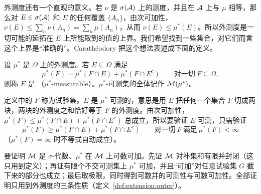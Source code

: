 外测度还有一个直观的意义。若 $\nu$ 是 $\sigma(\mathcal{A})$ 上的测度，并且在 $\mathcal{A}$ 上与 $\mu$ 相等，那么对 $E\in\sigma(\mathcal{A})$ 和 $E$ 的任何覆盖 $\{A_n\}$，由次可加性，$\nu(E)\leqslant\sum_n\nu(A_n)=\sum_n\mu(A_n)$，从而 $\nu(E)\leqslant\mu^*(E)$。所以外测度是一切可能的延拓在 $E$ 上所能取到的值的上界。我们希望找到一些集合，对它们而言这个上界是“准确的”。Carathéodory 把这个想法表述成下面的定义。

\begin{definition}[Carathéodory 可测]\label{def:extension:caratheodory}
设 $\mu^*$ 是 $\Omega$ 上的外测度。若 $E\subseteq\Omega$ 满足
\[
\mu^*(F)=\mu^*(F\cap E)+\mu^*(F\cap E^c)\qquad\text{对一切}\ F\subseteq\Omega,
\]
则称 $E$ 是 （$\mu^*$-measurable）。$\mu^*$-可测集的全体记作 $\mathcal{M}(\mu^*)$。
\end{definition}

定义中的 $F$ 称为试验集。$E$ 是 $\mu^*$-可测的，意思是用 $E$ 把任何一个集合 $F$ 切成两块，两块的外测度之和恰好等于 $F$ 的外测度。由次可加性，$\mu^*(F)\leqslant\mu^*(F\cap E)+\mu^*(F\cap E^c)$ 总成立，所以要验证 $E$ 可测，只需验证
\begin{equation}\label{eq:extension:caratheodory-half}
\mu^*(F)\geqslant\mu^*(F\cap E)+\mu^*(F\cap E^c)\qquad\text{对一切}\ F\ \text{满足}\ \mu^*(F)<\infty
\end{equation}
（$\mu^*(F)=\infty$ 时不等式自动成立）。

\begin{remark}[证明思路]
要证明 $\mathcal{M}$ 是 $\sigma$-代数、$\mu^*$ 在 $\mathcal{M}$ 上可数可加。先证 $\mathcal{M}$ 对补集和有限并封闭（这只用到定义）；再证有限个不交可测集上 $\mu^*$ 可加，并且“可加”对任意试验集 $G$ 截下来的部分也成立；最后取极限，同时得到可数并的可测性与可数可加性。全部证明只用到外测度的三条性质（定义~\ref{def:extension:outer}）。
\end{remark}

